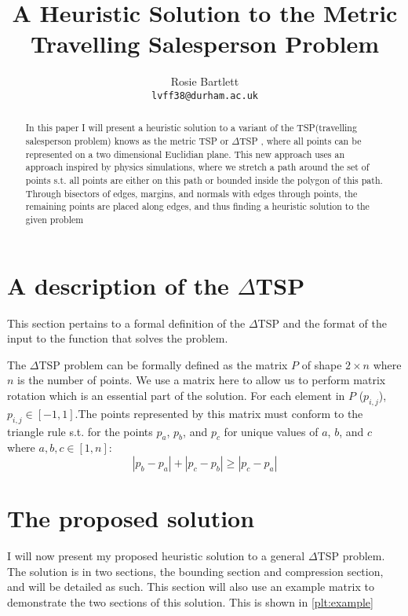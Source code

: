 \documentclass[11pt]{article}
\newcommand{\dtsp}{$\Delta$TSP }
\begin{document}
\title{A Heuristic Solution to the Metric Travelling Salesperson Problem}
\author{Rosie Bartlett\\\small\texttt{lvff38@durham.ac.uk}}
\maketitle
\begin{abstract}
	In this paper I will present a heuristic solution to a variant of the TSP(travelling salesperson problem) knows as the metric TSP or \dtsp, where all points can be represented on a two dimensional Euclidian plane. This new approach uses an approach inspired by physics simulations, where we stretch a path around the set of points s.t. all points are either on this path or bounded inside the polygon of this path. Through bisectors of edges, margins, and normals with edges through points, the remaining points are placed along edges, and thus finding a heuristic solution to the given problem
\end{abstract}

\section{A description of the \dtsp}
This section pertains to a formal definition of the \dtsp and the format of the input to the function that solves the problem.

The \dtsp problem can be formally defined as the matrix $P$ of shape $2\times n$ where $n$ is the number of points. We use a matrix here to allow us to perform matrix rotation which is an essential part of the solution. For each element in $P$ ($p_{i,j}$), $p_{i,j}\in[-1,1]$.The points represented by this matrix must conform to the triangle rule s.t. for the points $p_a$, $p_b$, and $p_c$ for unique values of $a$, $b$, and $c$ where $a,b,c\in[1,n]$:
\begin{equation}
	|p_b-p_a|+|p_c-p_b|\geq|p_c-p_a|
\end{equation}\label{eqn:triangle_rule}

\section{The proposed solution}
I will now present my proposed heuristic solution to a general \dtsp problem. The solution is in two sections, the bounding section and compression section, and will be detailed as such. This section will also use an example matrix to demonstrate the two sections of this solution. This is shown in \cref{plt:example}
\end{document}
